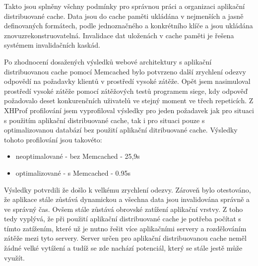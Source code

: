 \documentclass[12pt]{article}
\begin{document}
Takto jsou splněny všchny podmínky pro správnou práci a organizaci aplikační distribuované cache. Data jsou do cache paměti ukládána v nejmenších a jasně definovaných formátech, podle jednoznačného a konkrétního klíče a jsou ukládána znovuzrekonstruovatelná. Invalidace dat uloženách v cache paměti je řešena systémem invalidačních kaskád.

Po zhodnocení dosažených výsledků webové architektury s aplikační distribuovanou cache pomocí Memcached bylo potvrzeno další zrychlení odezvy odpovědí na požadavky klientů v prostředí vysoké zátěže. Opět jsem nasimuloval prostředí vysoké zátěže pomocí zátěžových testů programem siege, kdy odpověď požadovalo deset konkurenčních uživatelů ve stejný moment ve třech repeticích. Z XHProf profilování jsem vyprofiloval výsledky pro jeden požadavek jak pro situaci s použitím aplikační distribuované cache, tak i pro situaci pouze s optimalizovanou databází bez použití aplikační ditribuované cache. Výsledky tohoto profilování jsou takovéto:

\begin{itemize}
\item neoptimalované - bez Memcached - 25,9s
\item optimalizované - s Memcached - 0.95s
\end{itemize}

Výsledky potvrdili že došlo k velkému zrychlení odezvy. Zároveň bylo otestováno, že aplikace stále zůstává dynamickou a všechna data jsou invalidována správně a ve správný čas. Ovšem stále zůstává obrovské zatížení aplikační vrstvy. Z toho tedy vyplývá, že při použití aplikační distribuované cache je potřeba počítat s tímto zatížením, které už je nutno řešit více aplikačními servery a rozdělováním zátěže mezi tyto servery. Server určen pro aplikační distribuovanou cache neměl žádné velké vytížení a tudíž se zde nachází potenciál, který se stále jestě může využít.

\obrazek
{}

\clearpage

\obrazek
{}

\obrazek
{}
\end{document}
